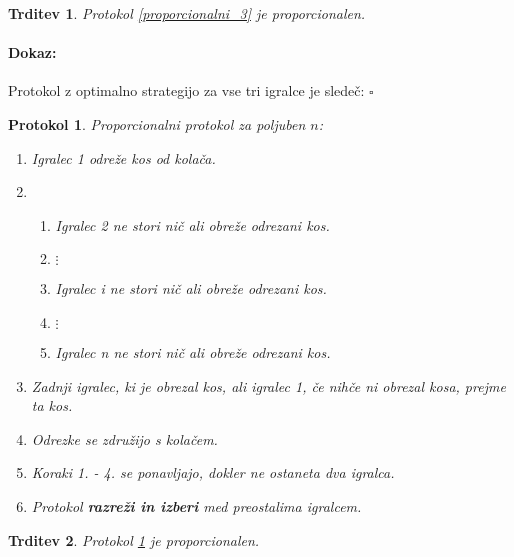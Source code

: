 \documentclass[a4paper, 12pt]{article}
\newtheorem{trditev}{Trditev}
\newtheorem{protokol}{Protokol}
\newenvironment{dokaz}{\paragraph{Dokaz:}}{\hfill$\square$\\}
\begin{document}
	\begin{trditev}
		Protokol \ref{proporcionalni_3} je proporcionalen.
	\end{trditev}

	\begin{dokaz}
		Protokol z optimalno strategijo za vse tri igralce je sledeč:
	\end{dokaz}

	\begin{protokol}
		\label{proporcionalni_n}
		Proporcionalni protokol za poljuben $n$:
		\begin{enumerate}
			
			\item Igralec 1 odreže kos od kolača.
			
			\item \begin{enumerate}
							
				\item[(1.)] Igralec 2 ne stori nič ali obreže odrezani kos.
				
				\item[] $\vdots$
				
				\item[(i.)] Igralec i ne stori nič ali obreže odrezani kos.
				
				\item[] $\vdots$
				
				\item[(n.)] Igralec n ne stori nič ali obreže odrezani kos.
				
			\end{enumerate}
		
			\item Zadnji igralec, ki je obrezal kos, ali igralec 1, če nihče ni obrezal kosa, prejme ta kos.
			
			\item Odrezke se združijo s kolačem.
			
			\item Koraki 1. - 4. se ponavljajo, dokler ne ostaneta dva igralca.
			
			\item Protokol \textbf{razreži in izberi} med preostalima igralcem.
			
		\end{enumerate}
	\end{protokol}

	\begin{trditev}
		Protokol \ref{proporcionalni_n} je proporcionalen.
	\end{trditev}
\end{document}
